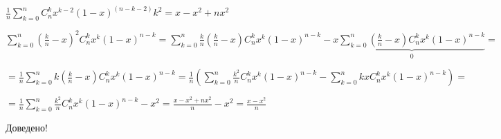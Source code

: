 $
\frac{1}{n}\sum\limits_{k=0}^{n}C_n^kx^{k - 2}(1 - x)^{(n - k -2)}k^2=
x - x^2 + nx^2
$


\newpage

$ \sum\limits_{k=0}^{n}(\frac{k}{n} - x)^2 C_n^kx^k(1-x)^{n-k} = 
\sum\limits_{k=0}^{n}\frac{k}{n}(\frac{k}{n} - x) C_n^kx^k(1-x)^{n-k} - 
x\underbrace{\sum\limits_{k=0}^{n}(\frac{k}{n} - x) C_n^kx^k(1-x)^{n-k}}_{\mbox{0}} = $


$=\frac{1}{n}\sum\limits_{k=0}^{n}k(\frac{k}{n} - x) C_n^kx^k(1-x)^{n-k} = 
\frac{1}{n}(\sum\limits_{k=0}^{n}\frac{k^2}{n} C_n^kx^k(1-x)^{n-k} - 
\sum\limits_{k=0}^{n}kxC_n^kx^k(1-x)^{n-k})=$


$=\frac{1}{n}\sum\limits_{k=0}^{n}\frac{k^2}{n} C_n^kx^k(1-x)^{n-k} - 
x^2 = \frac{x - x^2 +nx^2}{n} - x^2 =\frac{x - x^2}{n}$


Доведено!
